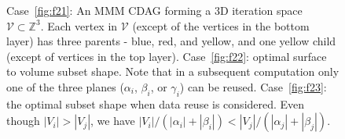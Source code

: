 \documentclass[sigplan,review,anonymous,10pt]{acmart}\settopmatter{printfolios=true,printccs=false,printacmref=false}
\begin{document}
\begin{figure}
	\centering
	\hfill
	\hfill
		\caption{
			Case~\ref{fig:f21}:
		An MMM CDAG forming a 3D 
		iteration 
		space $\mathcal{V} \subset \mathbb{Z}^3$.
		Each 
		vertex 
		in $\mathcal{V}$
		(except of the vertices in the bottom layer) has 
		three parents - blue, 
		red, 
		and yellow, and one yellow child (except of vertices 
		in the top layer). 
		Case~\ref{fig:f22}: 
		optimal surface to volume subset shape. Note that in 
		a subsequent computation only one of the three planes 
		($\alpha_i$, $\beta_i$, or $\gamma_i$) 
		can 
		be reused. 
		Case~\ref{fig:f23}: the optimal subset shape 
		when 
		data reuse is considered. Even though 
		$|V_i| > |V_j|$, we have
		$|V_i|/(|\alpha_i| + |\beta_i|) < |V_j|/(|\alpha_j| + 
		|\beta_j|)$.
	}

\end{figure}
\end{document}
